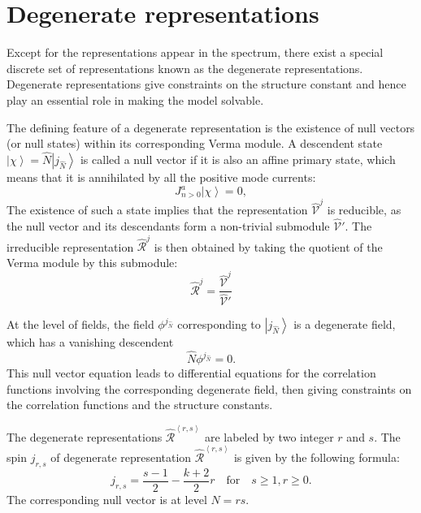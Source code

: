 \documentclass[10pt,a4paper]{article}
\numberwithin{equation}{section}
\newcommand{\ket}[1]{\left| #1 \right\rangle}
\newcommand{\vev}[1]{\left\langle #1 \right\rangle}
\begin{document}
\section{Degenerate representations}
Except for the representations appear in the spectrum, there exist a special discrete set of representations known as the 
degenerate representations. Degenerate representations give constraints on the structure constant and hence play an essential role in 
making the model solvable. 

The defining feature of a degenerate representation is the existence of null vectors (or null states) within its corresponding Verma module.
A descendent state $\ket{\chi} = \hat{N} \ket{j_{\hat{N}}} $ is called a null vector if it is also an affine primary state, which means 
that it is annihilated by all the positive mode currents:
\begin{equation}
    J^{a}_{n>0} \ket{\chi} = 0, \label{nullvectoreq}
\end{equation}
The existence of such a state implies that the representation $\widehat{\mathcal{V}}^{j}$ is reducible, 
as the null vector and its descendants form a non-trivial submodule $\widehat{\mathcal{V}}'$. 
The irreducible representation $\widehat{\mathcal{R}}^{j}$ is then obtained by taking the quotient of the Verma module by this submodule:
\begin{equation}
    \widehat{\mathcal{R}}^{j} = \frac{\widehat{\mathcal{V}}^{j}}{ \widehat{\mathcal{V}}'}
\end{equation}

At the level of fields, the field $\phi^{j_{\hat{N}}}$ corresponding to
$\ket{j_{\hat{N}}}$ is a degenerate field, which has a vanishing descendent 
\begin{equation}
    \hat{N} \phi^{j_{\hat{N}}} = 0.
\end{equation}
This null vector equation leads to differential equations for the correlation functions involving the corresponding degenerate field, then 
giving constraints on the correlation functions and the structure constants. 

The degenerate representations $\widehat{\mathcal{R}}^{\vev{r,s}}$ are labeled by two integer $r$ and $s$. The spin $j_{r,s}$ of 
degenerate representation $\widehat{\mathcal{R}}^{\vev{r,s}}$ is given by the following formula: 
\begin{equation}
    j_{r,s} = \frac{s-1}{2} - \frac{k+2}{2} r \quad \mathrm{for} \quad s\geq 1, r \geq 0.
\end{equation}
The corresponding null vector is at level $N=rs$.
\end{document}
